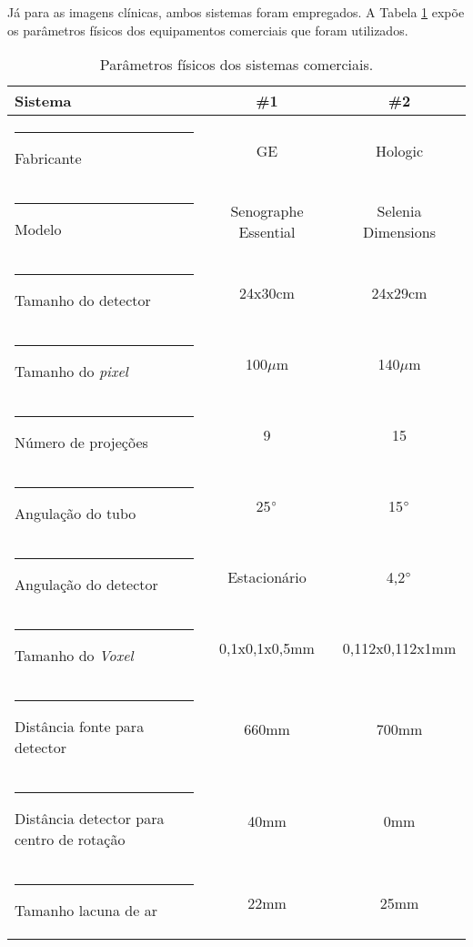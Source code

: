 Já para as imagens clínicas, ambos sistemas foram empregados. A Tabela \ref{tab:tabCap4ParametrosEquipamentos} expõe os parâmetros físicos dos equipamentos comerciais que foram utilizados.

\begin{table}[H]
	\centering
	\caption{Parâmetros físicos dos sistemas comerciais.}
	\label{tab:tabCap4ParametrosEquipamentos}
	\begin{tabular}{l|c|c}
		\textbf{Sistema}                            &   \textbf{\#1}   &   \textbf{\#2}\\
		[5pt]
		\hline
		\hline
		\rule[-0.5ex]{-3pt}{1ex}
		Fabricante												& \acs{GE} & Hologic \\ \hline
		\rule[-0.5ex]{-3pt}{1ex}
		Modelo													&  Senographe Essential &  Selenia Dimensions\\ \hline
		\rule[-0.5ex]{-3pt}{1ex}
		Tamanho do detector 						  &      24x30cm  &      24x29cm      \\ \hline
		\rule[-0.5ex]{-3pt}{1ex}
		Tamanho do \textit{pixel}                     &     100$\mu$m  &     140$\mu$m     \\ \hline
		\rule[-0.5ex]{-3pt}{1ex}
		Número de projeções                           &         9 &         15         \\ \hline
		\rule[-0.5ex]{-3pt}{1ex}
		Angulação do tubo                             &    25$\degree$   &    15$\degree$    \\ \hline
		\rule[-0.5ex]{-3pt}{1ex}
		Angulação do detector                         &    Estacionário  &    4,2$\degree$  \\ \hline
		\rule[-0.5ex]{-3pt}{1ex}
		Tamanho do \textit{Voxel}                     &   0,1x0,1x0,5mm   &   0,112x0,112x1mm \\ \hline
		\rule[-0.5ex]{-3pt}{1ex}
		Distância fonte para detector                 &       660mm  &       700mm       \\ \hline
		\rule[-0.5ex]{-3pt}{1ex}
		Distância detector para centro de rotação     &        40mm     &        0mm   \\ \hline
		\rule[-0.5ex]{-3pt}{1ex}
		Tamanho lacuna de ar                          &        22mm   &        25mm     \\ \hline
	\end{tabular}
	\vspace{2ex}
\end{table}

